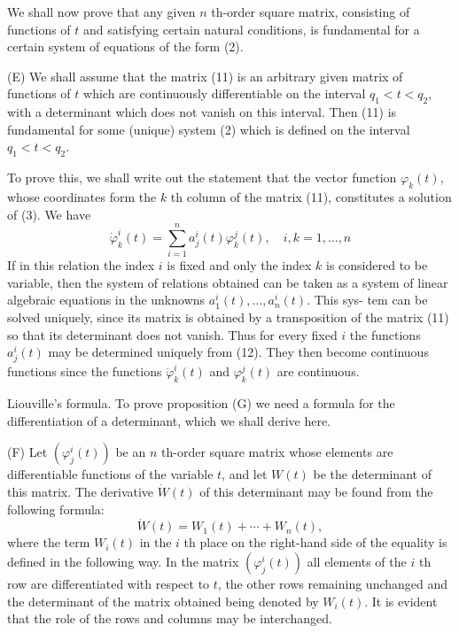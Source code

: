 \documentclass[10pt,a5paper]{book}
\theoremstyle{plain}
\theoremstyle{definition}
\theoremstyle{remark}
\begin{document}
We shall now prove that any given $n$ th-order square matrix, consisting of functions of $t$ and satisfying certain natural conditions, is fundamental for a certain system of equations of the form (2).

(E) We shall assume that the matrix (11) is an arbitrary given matrix of functions of $t$ which are continuously differentiable on the interval $q_{1}<t<q_{2}$, with a determinant which does not vanish on this interval. Then (11) is fundamental for some (unique) system (2) which is defined on the interval $q_{1}<t<q_{2}$.

To prove this, we shall write out the statement that the vector function $\varphi_{k}(t)$, whose coordinates form the $k$ th column of the matrix (11), constitutes a solution of (3). We have
\begin{equation*}
\dot{\varphi}_{k}^{i}(t)=\sum_{i=1}^{n} a_{j}^{i}(t) \varphi_{k}^{j}(t), \quad i, k=1, \ldots, n \tag{12}
\end{equation*}
If in this relation the index $i$ is fixed and only the index $k$ is considered to be variable, then the system of relations obtained can be taken as a system of linear algebraic equations in the unknowns $a_{1}^{i}(t), \ldots, a_{n}^{i}(t)$. This sys-
tem can be solved uniquely, since its matrix is obtained by a transposition of the matrix (11) so that its determinant does not vanish. Thus for every fixed $i$ the functions $a_{j}^{i}(t)$ may be determined uniquely from (12). They then become continuous functions since the functions $\dot{\varphi}_{k}^{i}(t)$ and $\varphi_{k}^{j}(t)$ are continuous.

Liouville's formula. To prove proposition (G) we need a formula for the differentiation of a determinant, which we shall derive here.

(F) Let $\left(\varphi_{j}^{i}(t)\right)$ be an $n$ th-order square matrix whose elements are differentiable functions of the variable $t$, and let $W(t)$ be the determinant of this matrix. The derivative $\dot{W}(t)$ of this determinant may be found from the following formula:
\begin{equation*}
\dot{W}(t)=W_{1}(t)+\cdots+W_{n}(t), \tag{13}
\end{equation*}
where the term $W_{i}(t)$ in the $i$ th place on the right-hand side of the equality is defined in the following way. In the matrix $\left(\varphi_{j}^{i}(t)\right)$ all elements of the $i$ th row are differentiated with respect to $t$, the other rows remaining unchanged and the determinant of the matrix obtained being denoted by $W_{i}(t)$. It is evident that the role of the rows and columns may be interchanged.
\end{document}

